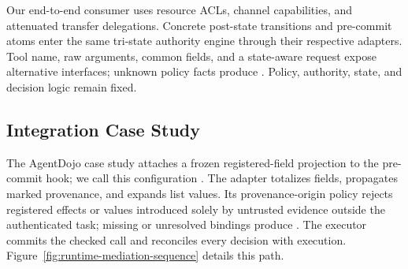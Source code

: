 Our end-to-end consumer uses resource ACLs, channel capabilities, and attenuated
transfer delegations. Concrete post-state transitions and pre-commit atoms enter
the same tri-state authority engine through their respective adapters. Tool
name, raw arguments, common fields, and a state-aware request expose alternative
interfaces; unknown policy facts produce \Abstain{}. Policy, authority, state,
and decision logic remain fixed.

\subsection{Integration Case Study}

The AgentDojo case study attaches a frozen registered-field projection to the
pre-commit hook; we call this configuration \sys{}. The adapter totalizes fields, propagates marked provenance, and
expands list values. Its provenance-origin policy rejects registered effects or
values introduced solely by untrusted evidence outside the authenticated task;
missing or unresolved bindings produce \Abstain{}. The executor commits the checked call and
reconciles every decision with execution.
Figure~\ref{fig:runtime-mediation-sequence} details this path.


